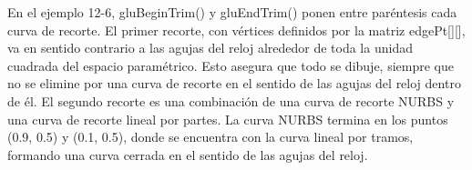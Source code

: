 En el ejemplo 12-6, gluBeginTrim() y gluEndTrim() ponen entre paréntesis cada curva de recorte. El primer recorte, con vértices definidos por la matriz edgePt[][], va en sentido contrario a las agujas del reloj alrededor de toda la unidad cuadrada del espacio paramétrico. Esto asegura que todo se dibuje, siempre que no se elimine por una curva de recorte en el sentido de las agujas del reloj dentro de él. El segundo recorte es una combinación de una curva de recorte NURBS y una curva de recorte lineal por partes. La curva NURBS termina en los puntos (0.9, 0.5) y (0.1, 0.5), donde se encuentra con la curva lineal por tramos, formando una curva cerrada en el sentido de las agujas del reloj.
